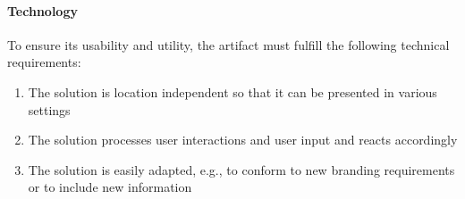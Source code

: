 \paragraph{Technology} To ensure its usability and utility, the artifact must fulfill the following technical requirements:
\begin{enumerate}[nosep]
\setcounter{enumi}{\value{foo}}
    \item The solution is location independent so that it can be presented in various settings
    \item The solution processes user interactions and user input and reacts accordingly
    \item The solution is easily adapted, e.g., to conform to new branding requirements or to include new information
\end{enumerate}



